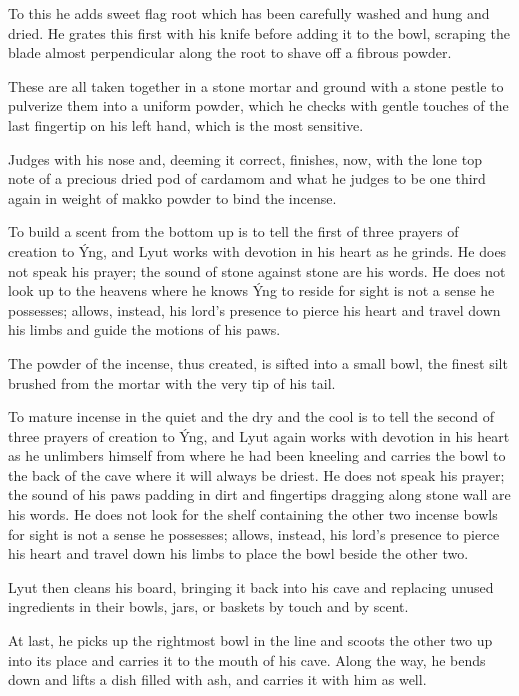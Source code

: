 To this he adds sweet flag root which has been carefully washed and hung and dried. He grates this first with his knife before adding it to the bowl, scraping the blade almost perpendicular along the root to shave off a fibrous powder.

These are all taken together in a stone mortar and ground with a stone pestle to pulverize them into a uniform powder, which he checks with gentle touches of the last fingertip on his left hand, which is the most sensitive.

Judges with his nose and, deeming it correct, finishes, now, with the lone top note of a precious dried pod of cardamom and what he judges to be one third again in weight of makko powder to bind the incense.

To build a scent from the bottom up is to tell the first of three prayers of creation to Ýng, and Lyut works with devotion in his heart as he grinds. He does not speak his prayer; the sound of stone against stone are his words. He does not look up to the heavens where he knows Ýng to reside for sight is not a sense he possesses; allows, instead, his lord's presence to pierce his heart and travel down his limbs and guide the motions of his paws.

The powder of the incense, thus created, is sifted into a small bowl, the finest silt brushed from the mortar with the very tip of his tail.

To mature incense in the quiet and the dry and the cool is to tell the second of three prayers of creation to Ýng, and Lyut again works with devotion in his heart as he unlimbers himself from where he had been kneeling and carries the bowl to the back of the cave where it will always be driest. He does not speak his prayer; the sound of his paws padding in dirt and fingertips dragging along stone wall are his words. He does not look for the shelf containing the other two incense bowls for sight is not a sense he possesses; allows, instead, his lord's presence to pierce his heart and travel down his limbs to place the bowl beside the other two.

Lyut then cleans his board, bringing it back into his cave and replacing unused ingredients in their bowls, jars, or baskets by touch and by scent.

At last, he picks up the rightmost bowl in the line and scoots the other two up into its place and carries it to the mouth of his cave. Along the way, he bends down and lifts a dish filled with ash, and carries it with him as well.

